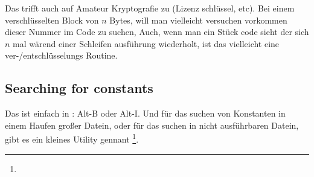 Das trifft auch auf Amateur Kryptografie zu (Lizenz schlüssel, etc). 
Bei einem verschlüsselten Block von $n$ Bytes, will man vielleicht versuchen vorkommen dieser Nummer im Code zu suchen,
Auch, wenn man ein Stück code sieht der sich $n$ mal wärend einer Schleifen ausführung wiederholt, ist das vielleicht
eine ver-/entschlüsselungs Routine.


\subsection{Searching for constants}

Das ist einfach in \IDA: Alt-B oder Alt-I.
Und für das suchen von Konstanten in einem Haufen großer Datein, oder für das suchen in nicht ausführbaren Datein,
gibt es ein kleines Utility gennant \footnote{\BGREPURL}.



